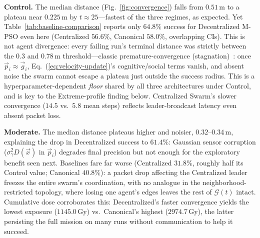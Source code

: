 \documentclass[conference]{IEEEtran}
\begin{document}
\textbf{Control.} The median distance (Fig.~\ref{fig:convergence}) falls from $0.51\,\text{m}$ to a plateau near $0.225\,\text{m}$ by $t\approx25$---fastest of the three regimes, as expected. Yet Table~\ref{tab:baseline-comparison} reports only $64.8\%$ success for Decentralized M-PSO even here (Centralized $56.6\%$, Canonical $58.0\%$, overlapping CIs). This is not agent divergence: every failing run's terminal distance was strictly between the $0.3$ and $0.78\,\text{m}$ threshold---classic premature-convergence (stagnation)~\cite{van_den_bergh_2002}: once $\vec{p}_i\approx\vec{g}_i$, Eq.~(\ref{eq:velocity-update})'s cognitive/social terms vanish, and absent noise the swarm cannot escape a plateau just outside the success radius. This is a hyperparameter-dependent \emph{floor} shared by all three architectures under Control, and is key to the Extreme-profile finding below. Centralized Swarm's slower convergence ($14.5$ vs.\ $5.8$ mean steps) reflects leader-broadcast latency even absent packet loss.

\textbf{Moderate.} The median distance plateaus higher and noisier, $0.32$--$0.34\,\text{m}$, explaining the drop in Decentralized success to $61.4\%$: Gaussian sensor corruption ($\sigma_\gamma^2 D(\vec{x})$ in $\vec{p}_i$) degrades final precision but not enough for the exploratory benefit seen next. Baselines fare far worse (Centralized $31.8\%$, roughly half its Control value; Canonical $40.8\%$): a packet drop affecting the Centralized leader freezes the entire swarm's coordination, with no analogue in the neighborhood-restricted topology, where losing one agent's edges leaves the rest of $\mathcal{G}(t)$ intact. Cumulative dose corroborates this: Decentralized's faster convergence yields the lowest exposure ($1145.0\,\text{Gy}$) vs.\ Canonical's highest ($2974.7\,\text{Gy}$), the latter persisting the full mission on many runs without communication to help it succeed.
\end{document}
